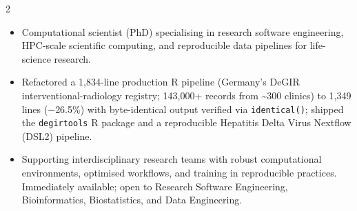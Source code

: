 \documentclass{thejus_cv}
\begin{document}
\begin{paracol}{2}


\begin{itemize}[label=\textbullet, leftmargin=1em]
    \item Computational scientist (PhD) specialising in research software engineering, HPC-scale scientific computing, and reproducible data pipelines for life-science research.
    \item Refactored a 1,834-line production R pipeline (Germany's DeGIR interventional-radiology registry; 143,000+ records from \textasciitilde300 clinics) to 1,349 lines ($-$26.5\%) with byte-identical output verified via \texttt{identical()}; shipped the \texttt{degirtools} R package and a reproducible Hepatitis Delta Virus Nextflow (DSL2) pipeline.
    \item Supporting interdisciplinary research teams with robust computational environments, optimised workflows, and training in reproducible practices. Immediately available; open to Research Software Engineering, Bioinformatics, Biostatistics, and Data Engineering.
\end{itemize}



\end{paracol}
\end{document}
